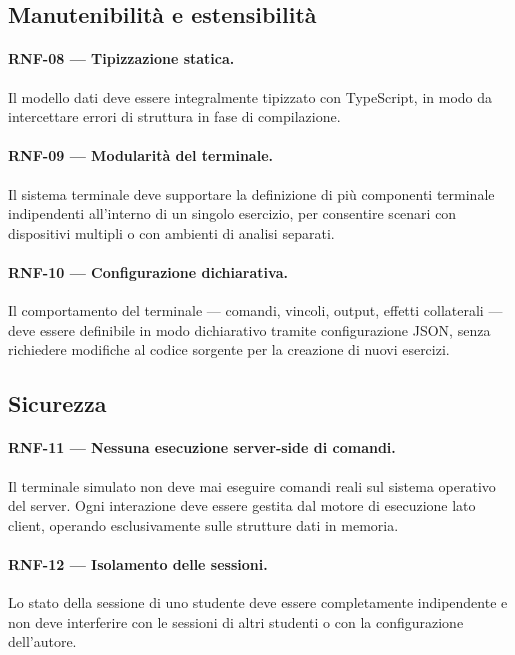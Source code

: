 \subsection{Manutenibilità e estensibilità}
\label{subsec:rnf-manutenibilita}

\paragraph{RNF-08 --- Tipizzazione statica.} Il modello dati deve essere integralmente tipizzato con TypeScript, in modo da intercettare errori di struttura in fase di compilazione.

\paragraph{RNF-09 --- Modularità del terminale.} Il sistema terminale deve supportare la definizione di più componenti terminale indipendenti all'interno di un singolo esercizio, per consentire scenari con dispositivi multipli o con ambienti di analisi separati.

\paragraph{RNF-10 --- Configurazione dichiarativa.} Il comportamento del terminale --- comandi, vincoli, output, effetti collaterali --- deve essere definibile in modo dichiarativo tramite configurazione JSON, senza richiedere modifiche al codice sorgente per la creazione di nuovi esercizi.

\subsection{Sicurezza}
\label{subsec:rnf-sicurezza}

\paragraph{RNF-11 --- Nessuna esecuzione server-side di comandi.} Il terminale simulato non deve mai eseguire comandi reali sul sistema operativo del server. Ogni interazione deve essere gestita dal motore di esecuzione lato client, operando esclusivamente sulle strutture dati in memoria.

\paragraph{RNF-12 --- Isolamento delle sessioni.} Lo stato della sessione di uno studente deve essere completamente indipendente e non deve interferire con le sessioni di altri studenti o con la configurazione dell'autore.


